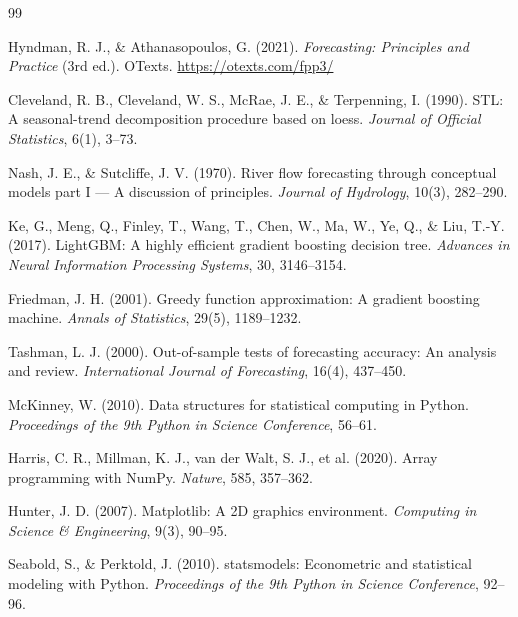 \clearpage
{}
\begin{thebibliography}{99}
\small
\setlength{\itemsep}{3pt}

Hyndman, R. J., \& Athanasopoulos, G. (2021).
\textit{Forecasting: Principles and Practice} (3rd ed.). OTexts.
\url{https://otexts.com/fpp3/}

Cleveland, R. B., Cleveland, W. S., McRae, J. E., \& Terpenning, I. (1990).
STL: A seasonal-trend decomposition procedure based on loess.
\textit{Journal of Official Statistics}, 6(1), 3--73.

Nash, J. E., \& Sutcliffe, J. V. (1970).
River flow forecasting through conceptual models part I --- A discussion of
principles. \textit{Journal of Hydrology}, 10(3), 282--290.

Ke, G., Meng, Q., Finley, T., Wang, T., Chen, W., Ma, W., Ye, Q., \& Liu, T.-Y.
(2017). LightGBM: A highly efficient gradient boosting decision tree.
\textit{Advances in Neural Information Processing Systems}, 30, 3146--3154.

Friedman, J. H. (2001).
Greedy function approximation: A gradient boosting machine.
\textit{Annals of Statistics}, 29(5), 1189--1232.

Tashman, L. J. (2000).
Out-of-sample tests of forecasting accuracy: An analysis and review.
\textit{International Journal of Forecasting}, 16(4), 437--450.

McKinney, W. (2010).
Data structures for statistical computing in Python.
\textit{Proceedings of the 9th Python in Science Conference}, 56--61.

Harris, C. R., Millman, K. J., van der Walt, S. J., et al. (2020).
Array programming with NumPy.
\textit{Nature}, 585, 357--362.

Hunter, J. D. (2007).
Matplotlib: A 2D graphics environment.
\textit{Computing in Science \& Engineering}, 9(3), 90--95.

Seabold, S., \& Perktold, J. (2010).
statsmodels: Econometric and statistical modeling with Python.
\textit{Proceedings of the 9th Python in Science Conference}, 92--96.

\end{thebibliography}

